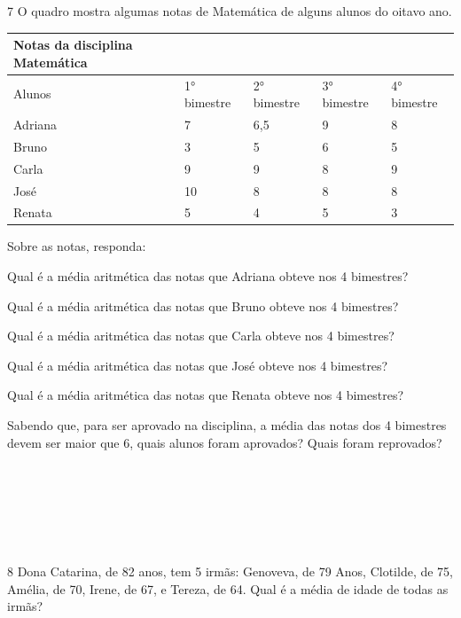 \pagebreak

\num{7} O quadro mostra algumas notas de Matemática de alguns alunos do oitavo ano.


\begin{longtable}[]{@{}lllll@{}}
\toprule
Notas da disciplina Matemática & & & &\tabularnewline
\midrule
\endhead
Alunos & 1° bimestre & 2° bimestre & 3° bimestre & 4°
bimestre\tabularnewline
Adriana & 7 & 6,5 & 9 & 8\tabularnewline
Bruno & 3 & 5 & 6 & 5\tabularnewline
Carla & 9 & 9 & 8 & 9\tabularnewline
José & 10 & 8 & 8 & 8\tabularnewline
Renata & 5 & 4 & 5 & 3\tabularnewline
\bottomrule
\end{longtable}

Sobre as notas, responda:

\begin{escolha}
\item Qual é a média aritmética das notas que Adriana obteve nos 4
bimestres?
\item Qual é a média aritmética das notas que Bruno obteve nos 4 bimestres?
\item Qual é a média aritmética das notas que Carla obteve nos 4 bimestres?
\item Qual é a média aritmética das notas que José obteve nos 4 bimestres?
\item Qual é a média aritmética das notas que Renata obteve nos 4
bimestres?
\item Sabendo que, para ser aprovado na disciplina, a média das notas dos 4
bimestres devem ser maior que 6, quais alunos foram aprovados? Quais
foram reprovados?
\end{escolha}

\\
\\
\\
\\
\\

\num{8} Dona Catarina, de 82 anos, tem 5 irmãs: Genoveva, de 79 Anos,
Clotilde, de 75, Amélia, de 70, Irene, de 67, e Tereza, de 64. Qual é a
média de idade de todas as irmãs?

